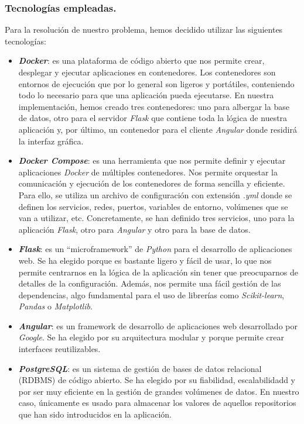 \subsubsection{Tecnologías empleadas.}
Para la resolución de nuestro problema, hemos decidido utilizar las siguientes tecnologías:

\begin{itemize}
    \item \textbf{\textit{Docker}}: es una plataforma de código abierto que nos permite crear, desplegar
    y ejecutar aplicaciones en contenedores. Los contenedores son entornos de ejecución que por
    lo general son ligeros y portátiles, conteniendo todo lo necesario para que una aplicación
    pueda ejecutarse. En nuestra implementación, hemos creado tres contenedores: uno para albergar
    la base de datos, otro para el servidor \textit{Flask} que contiene toda la lógica de nuestra
    aplicación y, por último, un contenedor para el cliente \textit{Angular} donde residirá la
    interfaz gráfica.\\

    \item \textbf{\textit{Docker Compose}}: es una herramienta que nos permite definir y ejecutar
    aplicaciones \textit{Docker} de múltiples contenedores. Nos permite orquestar la comunicación
    y ejecución de los contenedores de forma sencilla y eficiente. Para ello, se utiliza un archivo
    de configuración con extensión \textit{.yml} donde se definen los servicios, redes, puertos,
    variables de entorno, volúmenes que se van a utilizar, etc. Concretamente, se han definido
    tres servicios, uno para la aplicación \textit{Flask}, otro para \textit{Angular} y otro para
    la base de datos.\\

    \item \textbf{\textit{Flask}}: es un ``microframework'' de \textit{Python} para el desarrollo
    de aplicaciones web. Se ha elegido porque es bastante ligero y fácil de usar, lo que nos
    permite centrarnos en la lógica de la aplicación sin tener que preocuparnos de detalles de la
    configuración. Además, nos permite una fácil gestión de las dependencias, algo fundamental
    para el uso de librerías como \textit{Scikit-learn}, \textit{Pandas} o \textit{Matplotlib}.\\

    \item \textbf{\textit{Angular}}: es un framework de desarrollo de aplicaciones web desarrollado
    por \textit{Google}. Se ha elegido por su arquitectura modular y porque permite crear
    interfaces reutilizables.\\

    \item \textbf{\textit{PostgreSQL}}: es un sistema de gestión de bases de datos relacional
    (RDBMS) de código abierto. Se ha elegido por su fiabilidad, escalabilidadd y por ser muy
    eficiente en la gestión de grandes volúmenes de datos. En nuestro caso, únicamente es
    usado para almacenar los valores de aquellos repositorios que han sido introducidos en la
    aplicación.\\
\end{itemize}

